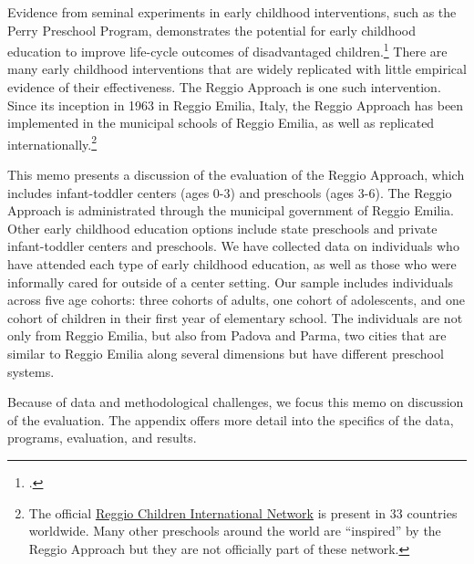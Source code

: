 Evidence from seminal experiments in early childhood interventions, such as the Perry Preschool Program, demonstrates the potential for early childhood education to improve life-cycle outcomes of disadvantaged children.\footnote{\citet{Heckman_Moon_etal_2010_QE, Elango_Hojman_etal_2016_Early-Edu}.} There are many early childhood interventions that are widely replicated with little empirical evidence of their effectiveness. The Reggio Approach is one such intervention. Since its inception in 1963 in Reggio Emilia, Italy, the Reggio Approach has been implemented in the municipal schools of Reggio Emilia, as well as replicated internationally.\footnote{The official \href{http://www.reggiochildren.it/network/?lang=en}{Reggio Children International Network} is present in 33 countries worldwide. Many other preschools around the world are ``inspired'' by the Reggio Approach but they are not officially part of these network.}

This memo presents a discussion of the evaluation of the Reggio Approach, which includes infant-toddler centers (ages 0-3) and preschools (ages 3-6). The Reggio Approach is administrated through the municipal government of Reggio Emilia. Other early childhood education options include state preschools and private infant-toddler centers and preschools. We have collected data on individuals who have attended each type of early childhood education, as well as those who were informally cared for outside of a center setting. Our sample includes individuals across five age cohorts: three cohorts of adults, one cohort of adolescents, and one cohort of children in their first year of elementary school. The individuals are not only from Reggio Emilia, but also from Padova and Parma, two cities that are similar to Reggio Emilia along several dimensions but have different preschool systems. 

Because of data and methodological challenges, we focus this memo on discussion of the evaluation. The appendix offers more detail into the specifics of the data, programs, evaluation, and results.

